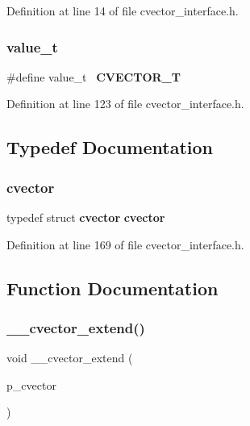 Definition at line 14 of file cvector\+\_\+interface.\+h.

\mbox{\label{cvector__interface_8h_a693b7d81758e9116dfebbbff0daa099b}} 
\subsubsection{value\+\_\+t}
{\footnotesize\ttfamily \#define value\+\_\+t~\textbf{ C\+V\+E\+C\+T\+O\+R\+\_\+T}}



Definition at line 123 of file cvector\+\_\+interface.\+h.



\subsection{Typedef Documentation}
\mbox{\label{cvector__interface_8h_ae8a3b37df7cac75e42faff09d0552627}} 
\subsubsection{cvector}
{\footnotesize\ttfamily typedef struct \textbf{ cvector} \textbf{ cvector}}



Definition at line 169 of file cvector\+\_\+interface.\+h.



\subsection{Function Documentation}
\mbox{\label{cvector__interface_8h_afa75ec5b8e81cc3d4e18298f8792f5a2}} 
\subsubsection{\+\_\+\+\_\+cvector\+\_\+extend()}
{\footnotesize\ttfamily void \+\_\+\+\_\+cvector\+\_\+extend (\begin{DoxyParamCaption}\item[{\textbf{ cvector} $\ast$}]{p\+\_\+cvector }\end{DoxyParamCaption})}

